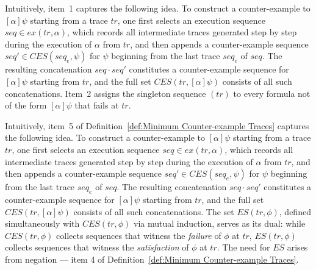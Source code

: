 \documentclass[manuscript,screen]{acmart}
\newcommand{\rNum}[1]{\expandafter{\romannumeral #1\relax}}
\newcommand{\EX}[0]{\textit{CES}}
\newcommand{\EXA}[0]{\textit{ES}}
\newcommand{\ex}[0]{\textit{ex}}
\DeclareMathOperator{\osuf}{\mathbf{suf}}
\DeclareMathOperator{\ofus}{\mathbf{fus}}
\newcommand{\A}[1]{\mbox{ \textbf{#1} }}
\newcommand{\MO}{\A{MO}}
\newcommand{\EMO}{\A{EMO}}
\begin{document}
Intuitively, item~1 captures the following idea.  To construct a counter-example to $[\alpha]\psi$ starting from a trace $tr$, one first selects an execution sequence $seq \in \ex(tr, \alpha)$, which records all intermediate traces generated step by step during the execution of $\alpha$ from $tr$, and then appends a counter-example sequence $seq' \in \EX(seq_e, \psi)$ for $\psi$ beginning from the last trace $seq_e$ of $seq$.  The resulting concatenation $seq \cdot seq'$ constitutes a counter-example sequence for $[\alpha]\psi$ starting from $tr$, and the full set $\EX(tr, [\alpha]\psi)$ consists of all such concatenations. 
Item~2 assigns the singleton sequence $(tr)$ to every formula not of the form $[\alpha]\psi$ that fails at $tr$. 

\ifx
Intuitively, item~5 of Definition~\ref{def:Minimum Counter-example Traces} captures the following idea.  To construct a counter-example to $[\alpha]\psi$ starting from a trace $tr$, one first selects an execution sequence $seq \in \ex(tr, \alpha)$, which records all intermediate traces generated step by step during the execution of $\alpha$ from $tr$, and then appends a counter-example sequence $seq' \in \EX(seq_e, \psi)$ for $\psi$ beginning from the last trace $seq_e$ of $seq$.  The resulting concatenation $seq \cdot seq'$ constitutes a counter-example sequence for $[\alpha]\psi$ starting from $tr$, and the full set $\EX(tr, [\alpha]\psi)$ consists of all such concatenations. 
The set $\EXA(tr, \phi)$, defined simultaneously with $\EX(tr, \phi)$ via mutual induction, serves as its dual: while $\EX(tr, \phi)$ collects sequences that witness the \emph{failure} of $\phi$ at $tr$, $\EXA(tr, \phi)$ collects sequences that witness the \emph{satisfaction} of $\phi$ at $tr$.  The need for $\EXA$ arises from negation --- item 4 of Definition~\ref{def:Minimum Counter-example Traces}.  
\fi
\end{document}
